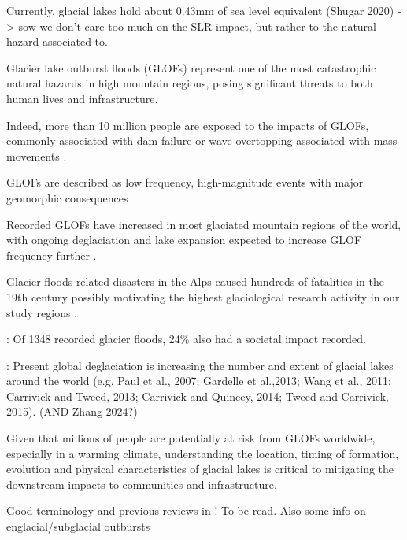 Currently, glacial lakes hold about 0.43mm of sea level equivalent (Shugar 2020) -> sow we don't care too much on the SLR impact, but rather to the natural hazard associated to.


Glacier lake outburst floods (GLOFs) represent one of the most catastrophic natural hazards in high mountain regions, posing significant threats to both human lives and infrastructure.

Indeed, more than 10 million people are exposed to the impacts of GLOFs, commonly associated with dam failure or wave overtopping associated with mass movements \cite{Zhang&al2024}.

GLOFs are described as low frequency, high-magnitude events with major geomorphic consequences

Recorded GLOFs have increased in most glaciated mountain regions of the world, with ongoing deglaciation and lake expansion expected to increase GLOF frequency further \cite{Zhang&al2024}.

Glacier floods-related disasters in the Alps caused hundreds of fatalities in the 19th century \cite{Haeberli1983,Vincent&al2010b,Ancey&al2019} possibly motivating the highest glaciological research activity in our study regions \cite{Veh&al2022}.

\cite{Carrivick&Tweed2016}: Of 1348 recorded glacier floods, 24\% also had a societal impact recorded.

\cite{Carrivick&Tweed2016}: Present global deglaciation is increasing the number and extent of glacial lakes around the world (e.g. Paul et al., 2007; Gardelle et al.,2013; Wang et al., 2011; Carrivick and Tweed, 2013; Carrivick and Quincey, 2014; Tweed and Carrivick, 2015). (AND Zhang 2024?)

Given that millions of people are potentially at risk from GLOFs worldwide, especially in a warming climate, understanding the location, timing of formation, evolution and physical characteristics of glacial lakes is critical to mitigating the downstream impacts to communities and infrastructure.

Good terminology and previous reviews in \cite{Korup&Tweed2007} ! To be read. Also some info on englacial/subglacial outbursts


